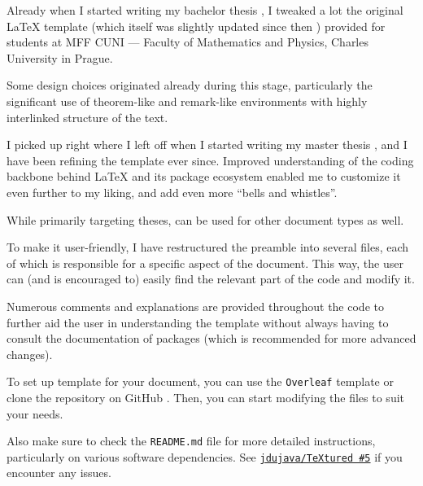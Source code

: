  \label{ch:Introduction}

Already when I started writing my bachelor thesis \autocite{Dujava2022}, I tweaked a lot the original \LaTeX{} template (which itself was slightly updated since then \autocite{MaresTemplate}) provided for students at MFF CUNI --- Faculty of Mathematics and Physics, Charles University in Prague.

Some design choices originated already during this stage, particularly the significant use of theorem-like and remark-like environments with highly interlinked structure of the text.

I picked up right where I left off when I started writing my master thesis \autocite{TODO}, and I have been refining the template ever since.
Improved understanding of the coding backbone behind \LaTeX{} and its package ecosystem enabled me to customize it even further to my liking, and add even more \enquote{bells and whistles}.

\begin{remark}
    While primarily targeting theses, \TeXtured{} can be used for other document types as well.
\end{remark}

To make it user-friendly, I have restructured the preamble into several files, each of which is responsible for a specific aspect of the document.
This way, the user can (and is encouraged to) easily find the relevant part of the code and modify it.

Numerous comments and explanations are provided throughout the code to further aid the user in understanding the template without always having to consult the documentation of packages (which is recommended for more advanced changes).

\begin{remark}
    To set up \TeXtured{} template for your document, you can use the \texttt{Overleaf} template or clone the repository on GitHub \autocite{TeXtured}.
    Then, you can start modifying the files to suit your needs.

    Also make sure to check the \texttt{README.md} file for more detailed instructions, particularly on various software dependencies.
    See \href{https://github.com/jdujava/TeXtured/issues/5}{\texttt{jdujava/TeXtured \#5}} if you encounter any issues.
\end{remark}

